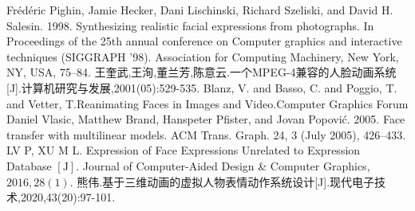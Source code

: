 \documentclass{ctexart}
\begin{document}
\begin{thebibliography}{99}
	 Frédéric Pighin, Jamie Hecker, Dani Lischinski, Richard Szeliski, and David H. Salesin. 1998. Synthesizing realistic facial expressions from photographs. In Proceedings of the 25th annual conference on Computer graphics and interactive techniques (SIGGRAPH '98). Association for Computing Machinery, New York, NY, USA, 75–84.
	 王奎武,王洵,董兰芳,陈意云.一个MPEG-4兼容的人脸动画系统[J].计算机研究与发展,2001(05):529-535.
	Blanz, V. and Basso, C. and Poggio, T. and Vetter, T.Reanimating Faces in Images and Video.Computer Graphics Forum
	Daniel Vlasic, Matthew Brand, Hanspeter Pfister, and Jovan Popović. 2005. Face transfer with multilinear models. ACM Trans. Graph. 24, 3 (July 2005), 426–433. 
	LV P, XU M L. Expression of Face Expressions Unrelated to
Expression Database $[\mathrm{J}] .$ Journal of Computer-Aided Design \&
Computer Graphics, $2016,28(1)$.
熊伟.基于三维动画的虚拟人物表情动作系统设计[J].现代电子技术,2020,43(20):97-101.


\end{thebibliography}
\end{document}

